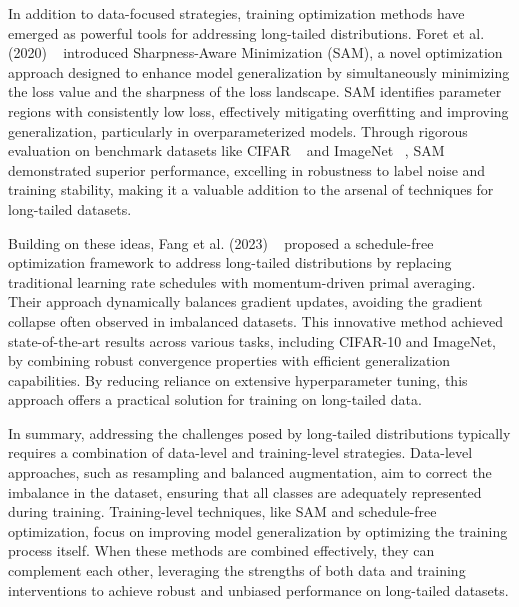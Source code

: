 In addition to data-focused strategies, training optimization methods have emerged as powerful tools for addressing long-tailed distributions. Foret et al. (2020) ~\cite{foret2020sharpness} introduced Sharpness-Aware Minimization (SAM), a novel optimization approach designed to enhance model generalization by simultaneously minimizing the loss value and the sharpness of the loss landscape. SAM identifies parameter regions with consistently low loss, effectively mitigating overfitting and improving generalization, particularly in overparameterized models. Through rigorous evaluation on benchmark datasets like CIFAR ~\cite{krizhevsky2009learning} and ImageNet ~\cite{deng2009imagenet}, SAM demonstrated superior performance, excelling in robustness to label noise and training stability, making it a valuable addition to the arsenal of techniques for long-tailed datasets.

Building on these ideas, Fang et al. (2023) ~\cite{defazio2024road} proposed a schedule-free optimization framework to address long-tailed distributions by replacing traditional learning rate schedules with momentum-driven primal averaging. Their approach dynamically balances gradient updates, avoiding the gradient collapse often observed in imbalanced datasets. This innovative method achieved state-of-the-art results across various tasks, including CIFAR-10 and ImageNet, by combining robust convergence properties with efficient generalization capabilities. By reducing reliance on extensive hyperparameter tuning, this approach offers a practical solution for training on long-tailed data.

In summary, addressing the challenges posed by long-tailed distributions typically requires a combination of data-level and training-level strategies. Data-level approaches, such as resampling and balanced augmentation, aim to correct the imbalance in the dataset, ensuring that all classes are adequately represented during training. Training-level techniques, like SAM and schedule-free optimization, focus on improving model generalization by optimizing the training process itself. When these methods are combined effectively, they can complement each other, leveraging the strengths of both data and training interventions to achieve robust and unbiased performance on long-tailed datasets.